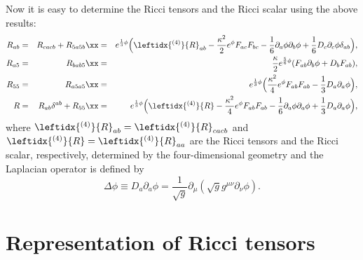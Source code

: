 \documentclass[12pt,epsf]{article}
\begin{document}
Now it is easy to determine the Ricci tensors and the Ricci scalar using the above results:
\begin{eqnarray}\label{kk-51}
R_{ab} &=& R_{cacb} + R_{5a5b} \xx
         &=&  e^{\frac{1}{3}\phi} \Big( \leftidx{^{(4)}}{R}_{ab}
         - \frac{\kappa^2}{2} e^\phi F_{ac} F_{bc} - \frac{1}{6} \partial_a \phi \partial_b \phi
         + \frac{1}{6} D_c \partial_c \phi \delta_{ab} \Big), \\
\label{kk-52}
R_{a5} &=& R_{bab5} \xx
        &=& \frac{\kappa}{2} e^{\frac{5}{6}\phi} (F_{ab} \partial_b \phi + D_b F_{ab} ), \\
\label{kk-53}
R_{55} &=& R_{a5a5} \xx
        &=& e^{\frac{1}{3}\phi} \Big( \frac{\kappa^2}{4} e^\phi F_{ab} F_{ab}
        - \frac{1}{3} D_a \partial_a \phi \Big),   \\
\label{kk-54}
R &=& R_{ab} \delta^{ab} + R_{55} \xx
&=& e^{\frac{1}{3}\phi} \Big( \leftidx{^{(4)}}{R}
         - \frac{\kappa^2}{4} e^\phi F_{ab} F_{ab} - \frac{1}{6} \partial_a \phi \partial_a \phi
         + \frac{1}{3} D_a \partial_a \phi \Big),
\end{eqnarray}
where $\leftidx{^{(4)}}{R}_{ab} = \leftidx{^{(4)}}{R}_{cacb}$ and $\leftidx{^{(4)}}{R} = \leftidx{^{(4)}}{R}_{aa}$
are the Ricci tensors and the Ricci scalar, respectively,
determined by the four-dimensional geometry  and the Laplacian operator is defined by
\begin{equation}\label{laplac}
  \Delta \phi \equiv D_a \partial_a \phi = \frac{1}{\sqrt{g}} \partial_\mu (\sqrt{g} g^{\mu\nu} \partial_\nu \phi).
\end{equation}








\section{Representation of Ricci tensors}
\end{document}
